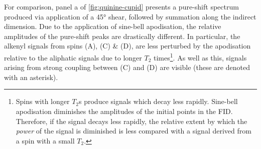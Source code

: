 For comparison, panel a of \cref{fig:quinine-cupid} presents a pure-shift
spectrum produced via application of a \ang{45} shear, followed by summation
along the indirect dimension. Due to the application of sine-bell apodisation,
the relative amplitudes of the pure-shift peaks are drastically different.
In particular, the alkenyl signals from spins (A), (C) \& (D), are less
perturbed by the apodisation relative to the aliphatic signals due to longer
$T_2$ times\footnote{
    Spins with longer $T_2$s produce signals which decay less rapidly.
    Sine-bell apodisation diminishes the amplitudes of the initial points in
    the \ac{FID}. Therefore, if the signal decays less rapidly, the relative
    extent by which the \emph{power} of the signal is diminished is less
    compared with a signal derived from a spin with a small $T_2$.
}. As well as this, signals arising from strong coupling between (C) and
(D) are visible (these are denoted with an asterisk).


